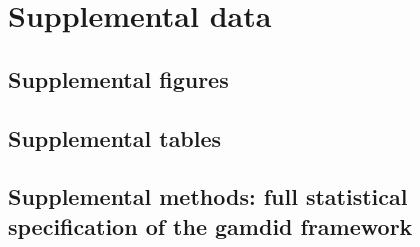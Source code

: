 \newpage
\section{Supplemental data} \label{supplementary}

\subsection{Supplemental figures} \label{suppl_figures}


\clearpage
\subsection{Supplemental tables} \label{suppl_tables}


\clearpage
\subsection{\texorpdfstring{Supplemental methods: full statistical specification of the gamdid framework}{Supplemental methods: full statistical specification of the gamdid framework}} \label{suppl_methods}

